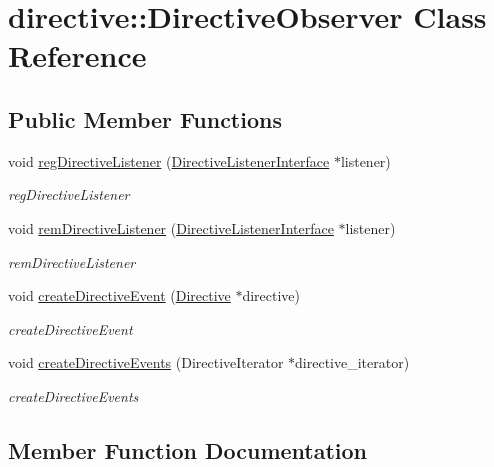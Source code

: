 \hypertarget{classdirective_1_1DirectiveObserver}{}\section{directive\+:\+:Directive\+Observer Class Reference}
\label{classdirective_1_1DirectiveObserver}
\subsection*{Public Member Functions}
\begin{DoxyCompactItemize}
\item 
void \hyperlink{classdirective_1_1DirectiveObserver_a129f3bf261411418d51a47e54ee6af59}{reg\+Directive\+Listener} (\hyperlink{classdirective_1_1DirectiveListenerInterface}{Directive\+Listener\+Interface} $\ast$listener)
\begin{DoxyCompactList}\small\item\em reg\+Directive\+Listener \end{DoxyCompactList}\item 
void \hyperlink{classdirective_1_1DirectiveObserver_a27624c4fa56f49e781338f61cd6cf125}{rem\+Directive\+Listener} (\hyperlink{classdirective_1_1DirectiveListenerInterface}{Directive\+Listener\+Interface} $\ast$listener)
\begin{DoxyCompactList}\small\item\em rem\+Directive\+Listener \end{DoxyCompactList}\item 
void \hyperlink{classdirective_1_1DirectiveObserver_aaf309ccf4120c08214efe57eaa35a1bf}{create\+Directive\+Event} (\hyperlink{classdirective_1_1Directive}{Directive} $\ast$directive)
\begin{DoxyCompactList}\small\item\em create\+Directive\+Event \end{DoxyCompactList}\item 
void \hyperlink{classdirective_1_1DirectiveObserver_a34c786a495ed077234647755e12f501a}{create\+Directive\+Events} (Directive\+Iterator $\ast$directive\+\_\+iterator)
\begin{DoxyCompactList}\small\item\em create\+Directive\+Events \end{DoxyCompactList}\end{DoxyCompactItemize}


\subsection{Member Function Documentation}
\mbox{\label{classdirective_1_1DirectiveObserver_aaf309ccf4120c08214efe57eaa35a1bf}} 

